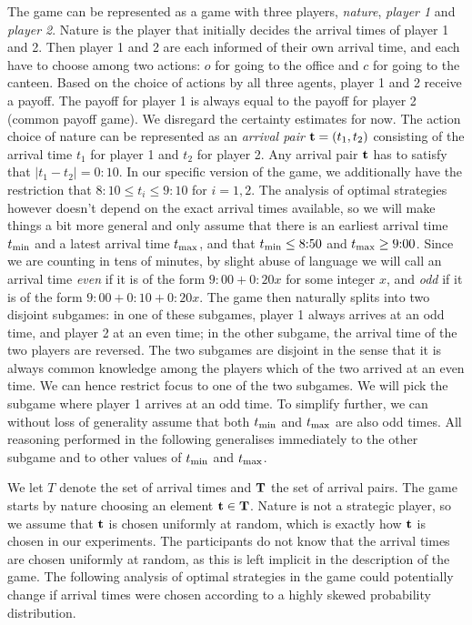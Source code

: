The game can be represented as a game with three players, \emph{nature}, \emph{player 1} and \emph{player 2}. Nature is the player that initially decides the arrival times of player 1 and 2. Then player 1 and 2 are each informed of their own arrival time, and each have to choose among two actions: $o$ for going to the office and $c$ for going to the canteen. Based on the choice of actions by all three agents, player 1 and 2 receive a payoff. The payoff for player 1 is always equal to the payoff for player 2 (common payoff game). We  disregard the certainty estimates for now. The action choice of nature can be represented as an \emph{arrival pair} ${\bf t} = (t_1,t_2)$ consisting of the arrival time $t_1$ for player 1 and $t_2$ for player 2. Any arrival pair $\bf t$ has to satisfy that  $| t_1 - t_2 | = 0{:}10$. In our specific version of the game, we additionally have the restriction that $8{:}10 \leq t_i \leq 9{:}10$ for $i = 1,2$. The analysis of optimal strategies however doesn't depend on the exact arrival times available, so we will make things a bit more general and only assume that there is an earliest arrival time $t_{\min}$ and a latest arrival time $t_{\max}$, and that $t_{\min} \leq 8{:}50$ and $t_{\max} \geq 9{:}00$. Since we are counting in tens of minutes, by slight abuse of language we will call an arrival time \emph{even} if it is of the form $9{:}00+0{:}20x$ for some integer $x$, and \emph{odd} if it is of the form $9{:}00+0{:}10+0{:}20x$. The game then naturally splits into two disjoint subgames: in one of these subgames, player 1 always arrives at an odd time, and player 2 at an even time; 
 in the other subgame, the arrival time of the two players are reversed. The two subgames are disjoint in the sense that it is always common knowledge among the players which of the two arrived at an even time. We can hence restrict focus to one of the two subgames. We will pick the subgame where player 1 arrives at an odd time. To simplify further, we can without loss of generality assume that both $t_{\min}$ and $t_{\max}$ are also odd times. All reasoning performed in the following generalises immediately to the other subgame and to other values of $t_{\min}$ and $t_{\max}$. 
 
We let $T$ denote the set of arrival times and $\bf T$ the set of arrival pairs.  
The game starts by nature choosing an element $\mathbf{t} \in \bf T$. Nature is not a strategic player, so we assume that $\bf t$ is chosen uniformly at random, which is exactly how $\bf t$ is chosen in our experiments. The participants do not know that the arrival times are chosen uniformly at random, as this is left implicit in the description of the game. The following analysis of optimal strategies in the game could potentially change if arrival times were chosen according to a highly skewed probability distribution.

